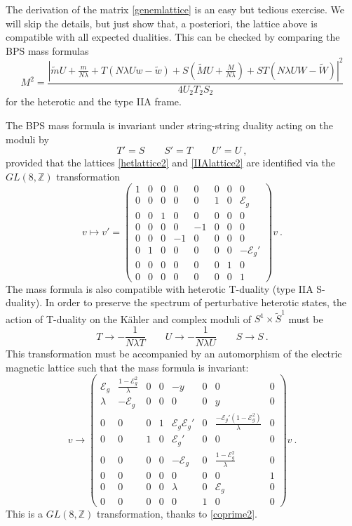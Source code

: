 \documentclass[a4paper,11pt]{article}
\newcommand{\ZZ}{\mathbb{Z}}
\newcommand{\E}{\mathcal{E}}
\numberwithin{equation}{section}
\def\be{\begin{equation}}
\def\ee{\end{equation}}
\begin{document}
 
The derivation of the matrix \eqref{genemlattice} is an easy but tedious exercise. We will skip the details, but just show that, a posteriori,  the lattice above is compatible with all expected dualities. This can be checked by comparing the BPS mass formulas
\be\label{BPSmass} M^2=\frac{|\tilde mU+\frac{m}{N\lambda}+T(N\lambda U w-\tilde w)+S(\tilde MU+\frac{M}{N\lambda})+ST(N\lambda UW-\tilde W)  |^2}{4U_2T_2S_2}
\ee for the heterotic and the type IIA frame.

The BPS mass formula is invariant under  string-string duality acting on the moduli by
\be  T'= S\qquad S'=T\qquad U'=U\ ,
\ee provided that the lattices \eqref{hetlattice2} and \eqref{IIAlattice2} are identified via the $GL(8,\ZZ)$ transformation
\be v\mapsto v'=\begin{pmatrix}
1 & 0 & 0 & 0 & 0 & 0 & 0 & 0 \\
 0 & 0 & 0 & 0 & 0 & 1 & 0 & \E_g \\
 0 & 0 & 1 & 0 & 0 & 0 & 0 & 0 \\
 0 & 0 & 0 & 0 & -1 & 0 & 0 & 0 \\
 0 & 0 & 0 & -1 & 0 & 0 & 0 & 0 \\
 0 & 1 & 0 & 0 & 0 & 0 & 0 & -\E_g' \\
 0 & 0 & 0 & 0 & 0 & 0 & 1 & 0 \\
 0 & 0 & 0 & 0 & 0 & 0 & 0 & 1
\end{pmatrix}v\ .
\ee 
The mass formula is also compatible  with heterotic T-duality (type IIA S-duality). In order to preserve the spectrum of perturbative heterotic states, the action of T-duality on the K\"ahler and complex moduli of $S^1\times \tilde S^1$ must be
\be T\to -\frac{1}{N\lambda T}\qquad U\to -\frac{1}{N\lambda U}\qquad S\to S\ .
\ee This transformation must be accompanied by an automorphism of the electric magnetic lattice such that the mass formula is invariant:
 \be
v\rightarrow
\begin{pmatrix}
\E_g  & \frac{1-\E_g ^2}{\lambda} & 0 & 0 & -y & 0 & 0 & 0 \\
 \lambda & -\E_g  & 0 & 0 & 0 & 0 & y & 0 \\
 0 & 0 & 0 & 1 & \E_g  {\E_g'}  & 0 & \frac{{-\E_g'} (1-\E_g ^2) }{\lambda} & 0 \\
 0 & 0 & 1 & 0 & {\E_g'}  & 0 & 0 & 0 \\
 0 & 0 & 0 & 0 & -\E_g  & 0 & \frac{1-\E_g ^2}{\lambda} & 0 \\
 0 & 0 & 0 & 0 & 0 & 0 & 0 & 1 \\
 0 & 0 & 0 & 0 & \lambda & 0 & \E_g  & 0 \\
 0 & 0 & 0 & 0 & 0 & 1 & 0 & 0
\end{pmatrix}v\ .
\ee
This is a $GL(8,\ZZ)$ transformation, thanks to \eqref{coprime2}.
\end{document}
